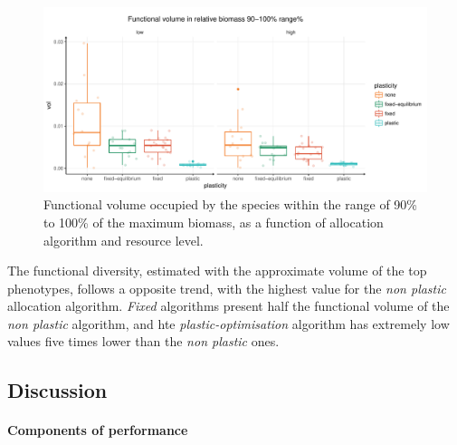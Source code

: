 \begin{figure}\label{fig:function_div}
\includegraphics[width = \textwidth]{./2_PP/Figures/Landscape/plot_fdiv.pdf}
\caption{Functional volume occupied by the species within the range of 90\% to 100\% of the maximum biomass, as a function of allocation algorithm and resource level.}
\end{figure}

The functional diversity, estimated with the approximate volume of the top phenotypes, follows a opposite trend, with the highest value for the \textit{non plastic} allocation algorithm. \textit{Fixed} algorithms present half the functional volume of the \textit{non plastic} algorithm, and hte \textit{plastic-optimisation} algorithm has extremely low values five times lower than the \textit{non plastic} ones.



\subsection{Discussion}

\paragraph{Components of performance}

